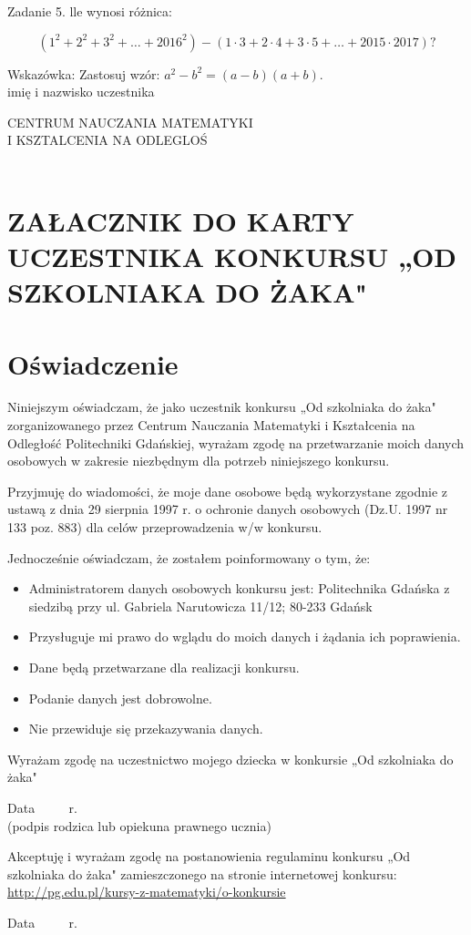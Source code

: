 \documentclass[10pt]{article}
\begin{document}
Zadanie 5. lle wynosi różnica:

\[
\left(1^{2}+2^{2}+3^{2}+\ldots+2016^{2}\right)-(1 \cdot 3+2 \cdot 4+3 \cdot 5+\ldots+2015 \cdot 2017) ?
\]

Wskazówka: Zastosuj wzór: \(a^{2}-b^{2}=(a-b)(a+b)\).\\
imię i nazwisko uczestnika

CENTRUM NAUCZANIA MATEMATYKI\\
I KSZTALCENIA NA ODLEGLOŚ\\
\(\qquad\)

\section*{ZAŁACZNIK DO KARTY UCZESTNIKA KONKURSU „OD SZKOLNIAKA DO ŻAKA"}
\section*{Oświadczenie}
Niniejszym oświadczam, że jako uczestnik konkursu „Od szkolniaka do żaka" zorganizowanego przez Centrum Nauczania Matematyki i Kształcenia na Odległość Politechniki Gdańskiej, wyrażam zgodę na przetwarzanie moich danych osobowych w zakresie niezbędnym dla potrzeb niniejszego konkursu.

Przyjmuję do wiadomości, że moje dane osobowe będą wykorzystane zgodnie z ustawą z dnia 29 sierpnia 1997 r. o ochronie danych osobowych (Dz.U. 1997 nr 133 poz. 883) dla celów przeprowadzenia w/w konkursu.

Jednocześnie oświadczam, że zostałem poinformowany o tym, że:

\begin{itemize}
  \item Administratorem danych osobowych konkursu jest: Politechnika Gdańska z siedzibą przy ul. Gabriela Narutowicza 11/12; 80-233 Gdańsk
  \item Przysługuje mi prawo do wglądu do moich danych i żądania ich poprawienia.
  \item Dane będą przetwarzane dla realizacji konkursu.
  \item Podanie danych jest dobrowolne.
  \item Nie przewiduje się przekazywania danych.
\end{itemize}

Wyrażam zgodę na uczestnictwo mojego dziecka w konkursie „Od szkolniaka do żaka"

Data \(\qquad\) r.\\
(podpis rodzica lub opiekuna prawnego ucznia)

Akceptuję i wyrażam zgodę na postanowienia regulaminu konkursu „Od szkolniaka do żaka" zamieszczonego na stronie internetowej konkursu: \href{http://pg.edu.pl/kursy-z-matematyki/o-konkursie}{http://pg.edu.pl/kursy-z-matematyki/o-konkursie}

Data \(\qquad\) r.
\end{document}
